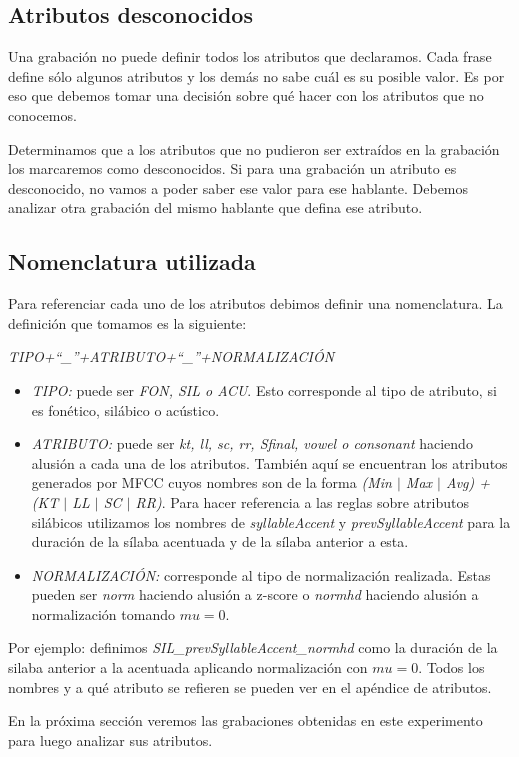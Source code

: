 \subsection{Atributos desconocidos}

Una grabación no puede definir todos los atributos que declaramos. Cada frase define sólo algunos atributos y los demás no sabe cuál es su posible valor. Es por eso que debemos tomar una decisión sobre qué hacer con los atributos que no conocemos. 

Determinamos que a los atributos que no pudieron ser extraídos en la grabación los marcaremos como desconocidos. Si para una grabación un atributo es desconocido, no vamos a poder saber ese valor para ese hablante. Debemos analizar otra grabación del mismo hablante que defina ese atributo.

\subsection{Nomenclatura utilizada}
Para referenciar cada uno de los atributos debimos definir una nomenclatura. La definición que tomamos es la siguiente:
\begin{center}
\textit{TIPO+``\_''+ATRIBUTO+``\_''+NORMALIZACIÓN} 
\end{center}

\begin{itemize}
  \item \emph{TIPO:} puede ser \emph{FON, SIL o ACU}. Esto corresponde al tipo de atributo, si es fonético, silábico o acústico.
  \item \emph{ATRIBUTO:} puede ser \emph{kt, ll, sc, rr, Sfinal, vowel o consonant} haciendo alusión a cada una de los atributos. También aquí se encuentran los atributos generados por MFCC cuyos nombres son de la forma \emph{(Min $|$ Max $|$ Avg) + (KT $|$ LL $|$ SC $|$ RR)}. Para hacer referencia a las reglas sobre atributos silábicos utilizamos los nombres de \emph{syllableAccent} y \emph{prevSyllableAccent} para la duración de la sílaba acentuada y de la sílaba anterior a esta.
  \item \emph{NORMALIZACIÓN:} corresponde al tipo de normalización realizada. Estas pueden ser \emph{norm} haciendo alusión a z-score o \emph{normhd} haciendo alusión a normalización tomando $mu=0$.
\end{itemize}
 
Por ejemplo: definimos \textit{SIL\_prevSyllableAccent\_normhd} como la duración de la silaba anterior a la acentuada aplicando normalización con $mu=0$. Todos los nombres y a qué atributo se refieren se pueden ver en el apéndice de atributos.

En la próxima sección veremos las grabaciones obtenidas en este experimento para luego analizar sus atributos.